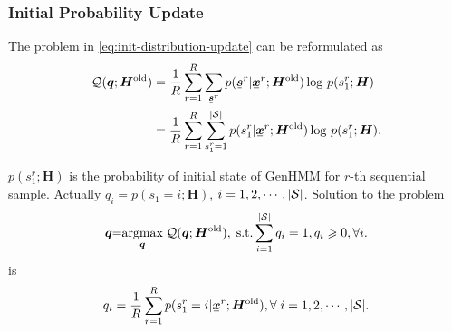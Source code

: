\documentclass{ecai}
\newcommand{\ubar}[1]{\mkern2mu\underline{\mkern-2mu #1\mkern-2mu}\mkern2mu}
\newcommand{\ubmr}[2]{\ubar{\bm{#1}}^{#2}}
\newcommand{\smtr}[3]{{#1}^{#3}_{#2}}
\begin{document}
\subsubsection{Initial Probability Update}
The problem in \eqref{eq:init-distribution-update} can be reformulated as
\begin{align}
  \Qq(\bm{q}; \bm{H}^{\mathrm{old}})
  &=\frac{1}{R} \sum_{r=1}^{R}\sum_{\ubmr{s}{r}} {p(\ubmr{s}{r}| \ubmr{x}{r}; \bm{H}^{\mathrm{old}})} \log\,p(\smtr{s}{1}{r};\bm{H}) \nonumber \\
  & = \frac{1}{R}\sum_{r=1}^{R}\sum_{\smtr{s}{1}{r}=1}^{|\Ss|}{p(\smtr{s}{1}{r}| \ubmr{x}{r}; \bm{H}^{\mathrm{old}})} \log\,p(\smtr{s}{1}{r};\bm{H}).
\end{align}

$p(\smtr{s}{1}{r};\bm{H})$ is the probability of initial state of GenHMM for $r$-th sequential sample. Actually $q_i = p({s}_{1} =i;\bm{H}) $, $i= 1, 2, \cdots, |\mathcal{S}|$. Solution to the problem
\begin{align}
  \bm{q} \hspace{-0.1cm} = \hspace{-0.1cm} \uargmax{\bm{q}} \Qq(\bm{q}; \bm{H}^{\mathrm{old}}),\; \mathrm{s.t.} \sum_{i=1}^{ |\Ss| }q_i = 1, q_i \geq 0, \forall i.
\end{align}
is
\begin{equation}\label{eq:update-initial-state-prob}
  q_i = \frac{1}{R} \sum_{r=1}^{R} p(\smtr{s}{1}{r}=i | \ubmr{x}{r}; \bm{H}^{\mathrm{old}}), \forall\; i = 1, 2, \cdots, |\Ss|.
\end{equation}
\end{document}
